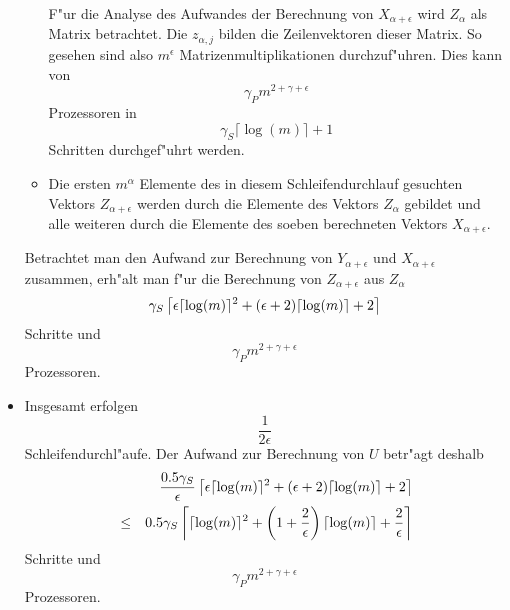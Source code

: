 \begin{itemize}
\begin{itemize}
            F"ur die Analyse des Aufwandes der Berechnung von 
            $X_{\alpha+\epsilon}$ wird $Z_\alpha$ als Matrix betrachtet.
            Die $z_{\alpha,j}$ bilden die Zeilenvektoren dieser Matrix.
            So gesehen sind also $m^\epsilon$ Matrizenmultiplikationen 
            durchzuf"uhren. Dies kann von 
            \[ \gamma_P m^{2+\gamma+\epsilon} \]
            Prozessoren in 
            \[ \gamma_S \lceil \log(m) \rceil + 1 \] 
            Schritten durchgef"uhrt werden.
      \item 
            Die ersten $m^\alpha$ Elemente des in diesem 
            Schleifendurchlauf gesuchten Vektors $Z_{\alpha+\epsilon}$
            werden durch die Elemente des Vektors $Z_\alpha$ gebildet und
            alle weiteren durch die Elemente des soeben berechneten 
            Vektors $X_{\alpha+\epsilon}$. 
      \end{itemize}
      Betrachtet man den Aufwand zur Berechnung von $Y_{\alpha+\epsilon}$
      und $X_{\alpha+\epsilon}$ zusammen, erh"alt man f"ur die
      Berechnung von $Z_{\alpha+\epsilon}$ aus $Z_{\alpha}$
      \[ 
         \gamma_S \left\lceil \epsilon \lceil \log(m) \rceil^2 +
            (\epsilon + 2) \lceil \log(m) \rceil + 2                      
         \right\rceil
      \]
      Schritte und \[ \gamma_P m^{2+\gamma+\epsilon} \] Prozessoren.
\item
      Insgesamt erfolgen \[ \frac{1}{2 \epsilon} \]
      Schleifendurchl"aufe. Der Aufwand zur Berechnung von $U$ betr"agt
      deshalb
      \begin{eqnarray*}
         & & \frac{ 0.5 \gamma_S }{ \epsilon }
         \left\lceil \epsilon \lceil \log(m) \rceil^2 +
            (\epsilon + 2) \lceil \log(m) \rceil + 2                      
         \right\rceil
      \\ 
         & \leq & 0.5 \gamma_S
         \left\lceil \lceil \log(m) \rceil^2 +
            \left( 1 + \frac{2}{\epsilon} \right) \lceil \log(m) \rceil + 
            \frac{2}{\epsilon}
         \right\rceil
      \end{eqnarray*} Schritte und
      \[ \gamma_P m^{2+\gamma+\epsilon} \] Prozessoren.
\end{itemize}

